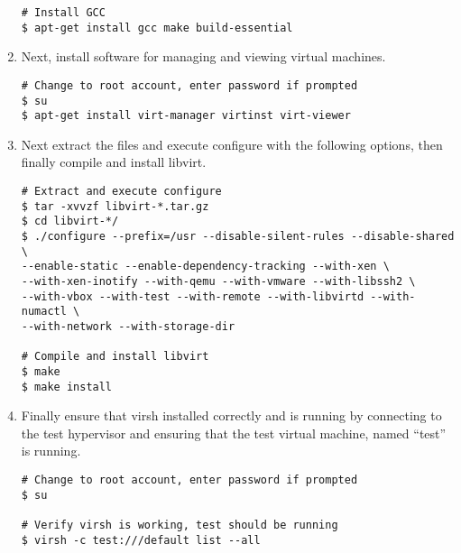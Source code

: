 \begin{enumerate}
\begin{lstlisting}
# Install GCC
$ apt-get install gcc make build-essential
\end{lstlisting}

\item	Next, install software for managing and viewing virtual machines.

\lstset{language=bash,caption=Install Virtual Machine Management Software}
\begin{lstlisting}
# Change to root account, enter password if prompted
$ su
$ apt-get install virt-manager virtinst virt-viewer
\end{lstlisting}
		
\item	Next extract the files and execute configure with the following options, then finally compile and install libvirt.

\lstset{language=bash,caption=Compile and Install libvirt}
\begin{lstlisting}
# Extract and execute configure
$ tar -xvvzf libvirt-*.tar.gz
$ cd libvirt-*/
$ ./configure --prefix=/usr --disable-silent-rules --disable-shared \
--enable-static --enable-dependency-tracking --with-xen \
--with-xen-inotify --with-qemu --with-vmware --with-libssh2 \
--with-vbox --with-test --with-remote --with-libvirtd --with-numactl \
--with-network --with-storage-dir

# Compile and install libvirt
$ make 
$ make install
\end{lstlisting}

\item 	Finally ensure that virsh installed correctly and is running by connecting to the test hypervisor and ensuring 
			that the test virtual machine, named ``test'' is running.

\lstset{language=bash,caption=Verify virsh was Installed Properly}
\begin{lstlisting}
# Change to root account, enter password if prompted
$ su

# Verify virsh is working, test should be running
$ virsh -c test:///default list --all
\end{lstlisting}
\end{enumerate}




